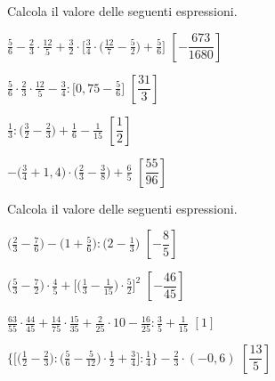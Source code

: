 \begin{esercizio}[\Ast]
\label{ese:3.144}
 Calcola il valore delle seguenti espressioni.
\begin{enumeratea}
\spazielenx
\item \(\displaystyle{\frac{5}{6}-\frac{2}{3}\cdot\frac{12}{5}+\frac{3}{2}
\cdot\bigg[\frac{3}{4}\cdot%
\bigg(\frac{12}{7}-\frac{5}{2}\bigg)+\frac{5}{6}\bigg]}\)
  \hfill \(\left[-\dfrac{673}{1680} \right]\)
\item \(\displaystyle{\frac{5}{6}\cdot{\frac{2}{3}}\cdot\frac{12}{5}-
\frac{3}{4}:\bigg[0,75-\frac{5}{6}\bigg]}\)
  \hfill \(\left[\dfrac{31}{3} \right]\)
\item \(\displaystyle{\frac{1}{3}:\bigg(\frac{3}{2}-\frac{2}{3}\bigg)+
\frac{1}{6}-\frac{1}{15}}\)
  \hfill \(\left[\dfrac{1}{2} \right]\)
\item \(\displaystyle{-\bigg(\frac{3}{4}+1,4\bigg)\cdot\bigg(\frac{2}{3}-
\frac{3}{8}\bigg)+\frac{6}{5}}\)
  \hfill \(\left[\dfrac{55}{96} \right]\)
\end{enumeratea}
\end{esercizio}

\begin{esercizio}[\Ast]
\label{ese:3.145}
 Calcola il valore delle seguenti espressioni.
\begin{enumeratea}
\spazielenx
\item \(\displaystyle{\bigg(\frac{2}{3}-\frac{7}{6}\bigg)-\bigg(1+
\frac{5}{6}\bigg):\bigg(2-\frac{1}{3}\bigg)}\)
  \hfill \(\left[-\dfrac{8}{5} \right]\)
\item \(\displaystyle{\bigg(\frac{5}{3}-\frac{7}{2}\bigg)\cdot\frac{4}{5}+
\bigg[\bigg(\frac{1}{3}-\frac{1}{15}\bigg)%
\cdot\frac{5}{2}\bigg]^{2}}\)
  \hfill \(\left[-\dfrac{46}{45} \right]\)
\item \(\displaystyle{\frac{63}{55}\cdot\frac{44}{45}+\frac{14}{75}\cdot
\frac{15}{35}+\frac{2}{25}\cdot%
10-\frac{16}{25}:\frac{3}{5}+\frac{1}{15}}\)
  \hfill \(\left[1 \right]\)
\item \(\displaystyle{\bigg\{\bigg[\bigg(\frac{1}{2}-\frac{2}{3}\bigg):
\bigg(\frac{5}{6}-\frac{5}{12}\bigg)\cdot%
\frac{1}{2}+\frac{3}{4}\bigg]:\frac{1}{4}\bigg\}-\frac{2}{3}\cdot(-0,6)}\)
  \hfill \(\left[\dfrac{13}{5} \right]\)
\end{enumeratea}
\end{esercizio}

